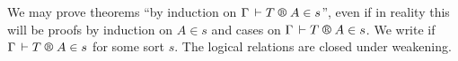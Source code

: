 \documentclass[acmlarge,review,anonymous]{acmart}\settopmatter{printfolios=true}
\newcommand{\LONGVERSION}[1]{}
\newcommand{\SHORTVERSION}[1]{#1}
\begin{document}
We may prove theorems ``by induction on $\LRTS \Gamma T A s$'', even if in reality this will be proofs by induction on $A \in s$ and cases on $\LRTS \Gamma T A s$.
We write  if\/ $\LRTS \Gamma T A s$ for some sort $s$.
\SHORTVERSION{The logical relations are closed under weakening.}
\LONGVERSION{ %
\begin{lemma}[Weakening]
  Let $\xi : \Gamma' \leq \Gamma$.
  \begin{enumerate}
  \item If\/ $\LRSize \Gamma a \alpha$ then $\LRSize{\Gamma'}{a\xi}\alpha$.
  \item If\/ $\LRTS {\Gamma} T A s$ then $\LRTS{\Gamma'}{T\xi}A s$.
  \item If\/ $\LR \Gamma t T f A$ then $\LR{\Gamma'}{t\xi}{T\xi} f A$.
  \end{enumerate}
\end{lemma}
} %

\end{document}
